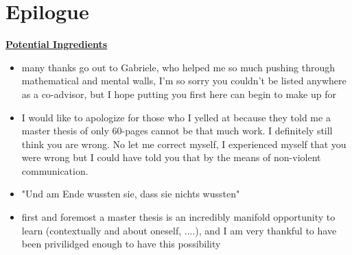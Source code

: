 \documentclass[a4paper, 11pt]{report}
\begin{document}
\chapter{Epilogue}

\underline{\textbf{Potential Ingredients}}

\begin{itemize}
	\item many thanks go out to Gabriele, who helped me so much pushing through mathematical and mental walls, I'm so sorry you couldn't be listed anywhere as a co-advisor, but I hope putting you first here can begin to make up for
	\item I would like to apologize for those who I yelled at because they told me a master thesis of only 60-pages cannot be that much work. I definitely still think you are wrong. No let me correct myself, I experienced myself that you were wrong but I could have told you that by the means of non-violent communication.
	\item "Und am Ende wussten sie, dass sie nichts wussten"
	\item first and foremost a master thesis is an incredibly manifold opportunity to learn (contextually and about oneself, ....), and I am very thankful to have been privilidged enough to have this possibility 
\end{itemize}
	

	
\end{document}
